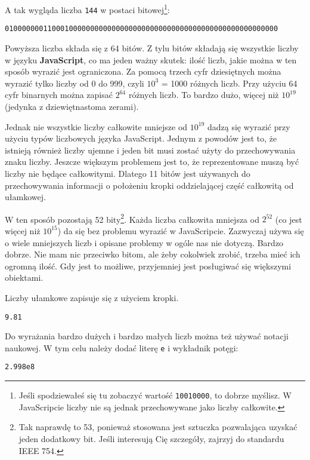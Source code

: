    
A tak wygląda liczba \texttt{144} w postaci bitowej\footnote{Jeśli spodziewałeś się tu zobaczyć wartość \texttt{10010000}, to dobrze myślisz. W JavaScripcie liczby nie są jednak przechowywane jako liczby całkowite.}:

\begin{verbatim} 
0100000001100010000000000000000000000000000000000000000000000000
\end{verbatim}
    
Powyższa liczba składa się z 64 bitów. Z tylu bitów składają się wszystkie liczby w języku \textbf{JavaScript}, co ma jeden ważny skutek: ilość liczb, jakie można w ten sposób wyrazić jest ograniczona. Za pomocą trzech cyfr dziesiętnych można wyrazić tylko liczby od 0 do 999, czyli $10^{3}$ = 1000 różnych liczb. Przy użyciu 64 cyfr binarnych można zapisać $2^{64}$ różnych liczb. To bardzo dużo, więcej niż $10^{19}$ (jedynka z dziewiętnastoma zerami).

    
Jednak nie wszystkie liczby całkowite mniejsze od $10^{19}$ dadzą się wyrazić przy użyciu typów liczbowych języka JavaScript. Jednym z powodów jest to, że istnieją również liczby ujemne i jeden bit musi zostać użyty do przechowywania znaku liczby. Jeszcze większym problemem jest to, że reprezentowane muszą być liczby nie będące całkowitymi. Dlatego 11 bitów jest używanych do przechowywania informacji o położeniu kropki oddzielającej część całkowitą od ułamkowej.

    
W ten sposób pozostają 52 bity\footnote{Tak naprawdę to 53, ponieważ stosowana jest sztuczka pozwalająca uzyskać jeden dodatkowy bit. Jeśli interesują Cię szczegóły, zajrzyj do standardu IEEE 754.}. Każda liczba całkowita mniejsza od $2^{52}$ (co jest więcej niż $10^{15}$) da się bez problemu wyrazić w JavaScripcie. Zazwyczaj używa się o wiele mniejszych liczb i opisane problemy w ogóle nas nie dotyczą. Bardzo dobrze. Nie mam nic przeciwko bitom, ale żeby cokolwiek zrobić, trzeba mieć ich ogromną ilość. Gdy jest to możliwe, przyjemniej jest posługiwać się większymi obiektami.

    
Liczby ułamkowe zapisuje się z użyciem kropki.

    \begin{verbatim} 
9.81
 \end{verbatim}
    
Do wyrażania bardzo dużych i bardzo małych liczb można też używać notacji naukowej. W tym celu należy dodać literę \texttt{e} i wykładnik potęgi:

    \begin{verbatim} 
2.998e8
 \end{verbatim}
    
